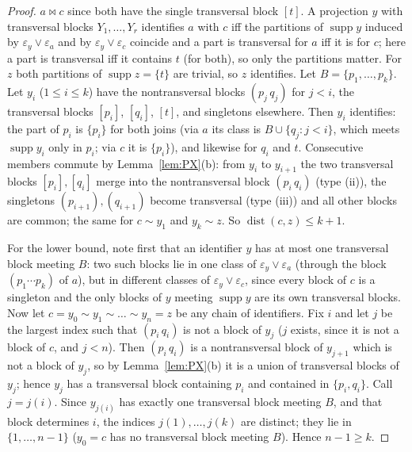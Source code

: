 \documentclass[11pt]{amsart}
\theoremstyle{definition}
\newcommand{\supp}{\operatorname{supp}}
\newcommand{\mt}{\bowtie}   %
\begin{document}
\begin{proof}
$a\mt c$ since both have the single transversal block $[t]$. A projection $y$ with transversal blocks $Y_1,\dots,Y_r$ identifies $a$ with $c$ iff the partitions of $\supp y$ induced by $\varepsilon_y\vee\varepsilon_a$ and by $\varepsilon_y\vee\varepsilon_c$ coincide and a part is transversal for $a$ iff it is for $c$; here a part is transversal iff it contains $t$ (for both), so only the partitions matter. For $z$ both partitions of $\supp z=\{t\}$ are trivial, so $z$ identifies. Let $B=\{p_1,\dots,p_k\}$. Let $y_i$ ($1\le i\le k$) have the nontransversal blocks $(p_j\,q_j)$ for $j<i$, the transversal blocks $[p_i]$, $[q_i]$, $[t]$, and singletons elsewhere. Then $y_i$ identifies: the part of $p_i$ is $\{p_i\}$ for both joins (via $a$ its class is $B\cup\{q_j:j<i\}$, which meets $\supp y_i$ only in $p_i$; via $c$ it is $\{p_i\}$), and likewise for $q_i$ and $t$. Consecutive members commute by Lemma~\ref{lem:PX}(b): from $y_i$ to $y_{i+1}$ the two transversal blocks $[p_i],[q_i]$ merge into the nontransversal block $(p_i\,q_i)$ (type (ii)), the singletons $(p_{i+1}),(q_{i+1})$ become transversal (type (iii)) and all other blocks are common; the same for $c\sim y_1$ and $y_k\sim z$. So $\operatorname{dist}(c,z)\le k+1$.

For the lower bound, note first that an identifier $y$ has at most one transversal block meeting $B$: two such blocks lie in one class of $\varepsilon_y\vee\varepsilon_a$ (through the block $(p_1\cdots p_k)$ of $a$), but in different classes of $\varepsilon_y\vee\varepsilon_c$, since every block of $c$ is a singleton and the only blocks of $y$ meeting $\supp y$ are its own transversal blocks. Now let $c=y_0\sim y_1\sim\dots\sim y_n=z$ be any chain of identifiers. Fix $i$ and let $j$ be the largest index such that $(p_i\,q_i)$ is not a block of $y_j$ ($j$ exists, since it is not a block of $c$, and $j<n$). Then $(p_i\,q_i)$ is a nontransversal block of $y_{j+1}$ which is not a block of $y_j$, so by Lemma~\ref{lem:PX}(b) it is a union of transversal blocks of $y_j$; hence $y_j$ has a transversal block containing $p_i$ and contained in $\{p_i,q_i\}$. Call $j=j(i)$. Since $y_{j(i)}$ has exactly one transversal block meeting $B$, and that block determines $i$, the indices $j(1),\dots,j(k)$ are distinct; they lie in $\{1,\dots,n-1\}$ ($y_0=c$ has no transversal block meeting $B$). Hence $n-1\ge k$.
\end{proof}
\end{document}
